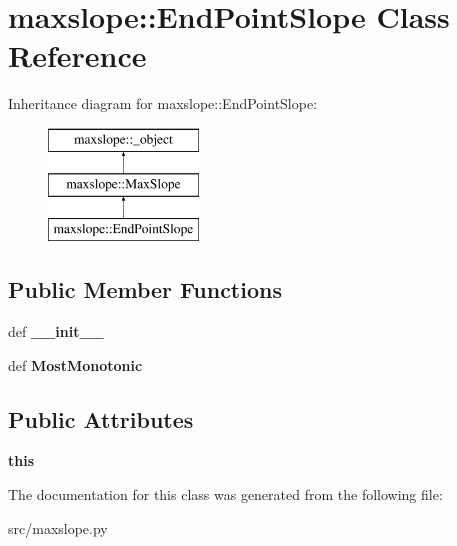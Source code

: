 \hypertarget{classmaxslope_1_1EndPointSlope}{
\section{maxslope::EndPointSlope Class Reference}
\label{d5/d36/classmaxslope_1_1EndPointSlope}
}
Inheritance diagram for maxslope::EndPointSlope:\begin{figure}[H]
\begin{center}
\leavevmode
\includegraphics[height=3cm]{d5/d36/classmaxslope_1_1EndPointSlope}
\end{center}
\end{figure}
\subsection*{Public Member Functions}
\begin{DoxyCompactItemize}
\item 
\hypertarget{classmaxslope_1_1EndPointSlope_aa64ffcafb99bb6f9978a9037f14a18db}{
def {\bfseries \_\-\_\-init\_\-\_\-}}
\label{d5/d36/classmaxslope_1_1EndPointSlope_aa64ffcafb99bb6f9978a9037f14a18db}

\item 
\hypertarget{classmaxslope_1_1EndPointSlope_ac9ac444eccb64b1489ddf729975cb201}{
def {\bfseries MostMonotonic}}
\label{d5/d36/classmaxslope_1_1EndPointSlope_ac9ac444eccb64b1489ddf729975cb201}

\end{DoxyCompactItemize}
\subsection*{Public Attributes}
\begin{DoxyCompactItemize}
\item 
\hypertarget{classmaxslope_1_1EndPointSlope_ac09aca88eb1acd43cdfe6292862a3de1}{
{\bfseries this}}
\label{d5/d36/classmaxslope_1_1EndPointSlope_ac09aca88eb1acd43cdfe6292862a3de1}

\end{DoxyCompactItemize}


The documentation for this class was generated from the following file:\begin{DoxyCompactItemize}
\item 
src/maxslope.py\end{DoxyCompactItemize}
